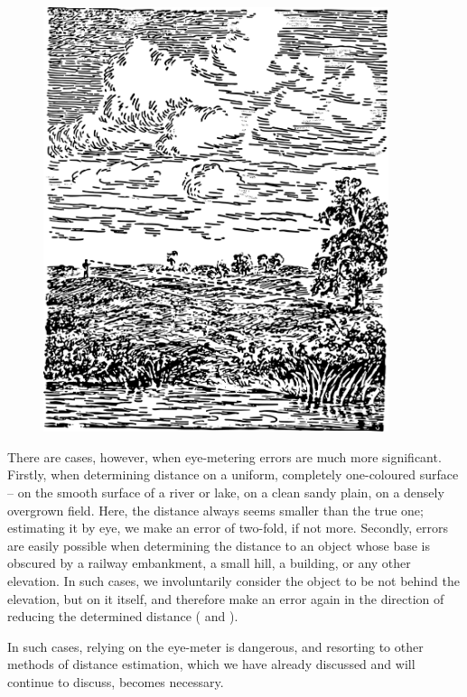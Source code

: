 \begin{figure}[h!]
\centering
\includegraphics[width=0.9\textwidth]{figures/ch-04/fig-080.pdf}
\end{figure}

There are cases, however, when eye-metering errors are much more significant. Firstly, when determining distance on a uniform, completely one-coloured surface -- on the smooth surface of a river or lake, on a clean sandy plain, on a densely overgrown field. Here, the distance always seems smaller than the true one; estimating it by eye, we make an error of two-fold, if not more. Secondly, errors are easily possible when determining the distance to an object whose base is obscured by a railway embankment, a small hill, a building, or any other elevation. In such cases, we involuntarily consider the object to be not behind the elevation, but on it itself, and therefore make an error again in the direction of reducing the determined distance ( and ).

In such cases, relying on the eye-meter is dangerous, and resorting to other methods of distance estimation, which we have already discussed and will continue to discuss, becomes necessary.


